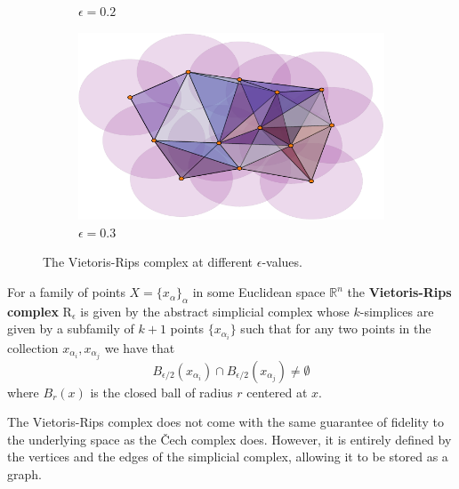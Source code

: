 \begin{figure}
\begin{subfigure}[b]{.49\linewidth}
    \caption{$\epsilon=0.2$}
 \end{subfigure}
  \begin{subfigure}[b]{.5\linewidth}
    \includegraphics[scale=.5]{rips_eps=03-crop.pdf}
    \caption{$\epsilon=0.3$}
 \end{subfigure}
 \caption{The Vietoris-Rips complex at different $\epsilon$-values.}
 \label{manyrips}
\end{figure}

\begin{definition}
For a family of points $X=\{x_{\alpha}\}_{\alpha}$ in some Euclidean space $\mathbb{R}^{n}$ the \textbf{Vietoris-Rips complex}
$\text{R}_{\epsilon}$ is given by the abstract simplicial complex whose $k$-simplices are given by a subfamily of $k+1$ points $\{x_{\alpha_{i}}\}$ such that for any two points in the collection $x_{\alpha_{i}}, x_{\alpha_{j}}$ we have that \[B_{\epsilon/2}(x_{\alpha_{i}}) \cap B_{\epsilon/2}(x_{\alpha_{j}}) \neq \emptyset\] where $B_{r}(x)$ is the closed ball of radius $r$ centered at $x$.
\end{definition}

The Vietoris-Rips complex does not come with the same guarantee of fidelity to the underlying space as the Čech complex does. However, it is entirely defined by the vertices and the edges of the simplicial complex, allowing it to be stored as a graph.

